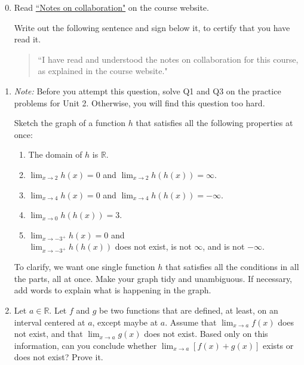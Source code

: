 \documentclass[12pt]{exam}
\newcommand {\DS} [1] {${\displaystyle #1}$}
\newcommand{\vv}{\vspace{.2cm}}
\newcommand{\R}{\mathbb{R}}
\begin{document}
\begin{enumerate}

\setcounter{enumi}{-1}

\item Read \href{https://www.math.toronto.edu/~alfonso/137/PS/137_2021_collaboration.pdf}{``Notes on collaboration"} on the course website.

	Write out the following sentence and sign below it, to certify that you have read it.
	
	\begin{quote}
		``I have read and understood the notes on collaboration for this course, as explained in the course website."
	\end{quote}

\vv

\newpage

\item \emph{Note:} Before you attempt this question, solve Q1 and Q3 on the practice problems for Unit 2.  Otherwise, you will find this question too hard.

  Sketch the graph of a function $h$ that satisfies all the following properties at once:
	\begin{enumerate}
		\item The domain of $h$ is $\R$.
		\item  \DS{\lim_{x \to 2} h(x) = 0} \; and \; \DS{\lim_{x \to 2} h(h(x)) = \infty}.
		\item  \DS{\lim_{x \to 4} h(x) = 0} \; and \; \DS{\lim_{x \to 4} h(h(x)) = - \infty}.
		\item \DS{\lim_{x \to 0} h(h(x))=3}.
		\item  \DS{\lim_{x \to -3^+} h(x) = 0} \; and \\
		   \DS{\lim_{x \to -3^+} h(h(x))} does not exist, is not $\infty$, and is not $-\infty$.
	\end{enumerate}
	To clarify, we want one single function $h$ that satisfies all the conditions in all the parts, all at once.  Make your graph tidy and unambiguous.  If necessary, add words to explain what is happening in the graph.  
\vv

\newpage

\item  Let \DS{a \in \R}.  Let $f$ and $g$ be two functions that are defined, at least, on an interval centered at $a$, except maybe at $a$.  
Assume that \DS{\lim_{x \to a} f(x)} does not exist, and that \DS{\lim_{x \to a} g(x)} does not exist.  Based only on this information, can you conclude whether \DS{\lim_{x \to a}\left[f(x) + g(x) \right]} exists or does not exist?  Prove it.


\end{enumerate}
\end{document}
